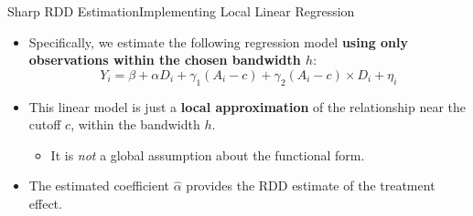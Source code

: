 \documentclass[dvipsnames,hyperref={pdfpagelabels=false}]{beamer}
\begin{document}
\begin{frame}{Sharp RDD Estimation}{Implementing Local Linear Regression}
	\begin{itemize}
		\item Specifically, we estimate the following regression model \textbf{using only observations within the chosen bandwidth $h$}:
		\begin{equation*}
			Y_i = \beta +\alpha D_i+ \gamma_1 (A_{i}-c) + \gamma_2 (A_{i}-c) \times D_i +\eta_i
		\end{equation*}
		\item This linear model is just a \textbf{local approximation} of the relationship near the cutoff $c$, within the bandwidth $h$. 
				\vspace{0.2cm}
			\begin{itemize}
		\item It is \textit{not} a global assumption about the functional form.
		\vspace{0.2cm}
			\end{itemize}
		\item The estimated coefficient $\hat{\alpha}$ provides the RDD estimate of the treatment effect.
	\end{itemize}
\end{frame}
\end{document}
